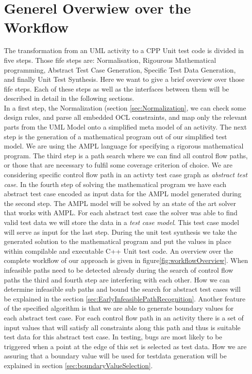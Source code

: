 \section{Generel Overwiew over the Workflow} %
\label{sec:testgenerationOverview}
The transformation from an UML activity to a CPP Unit test code is divided in five steps. Those fife steps are: Normalisation, Rigourous Mathematical programming, Abstract Test Case Generation, Specific Test Data Generation, and finally Unit Test Synthesis. Here we want to give a brief overview over those fife steps. Each of these steps as well as the interfaces between them will be described in detail in the following sections.\\
In a first step, the Normalization (section \ref{sec:Normalization}, we can check some design rules, and parse all embedded OCL constraints, and map only the relevant parts from the UML Model onto a simplified meta model of an activity. The next step is the generation of a mathematical program out of our simplified test model. We are using the AMPL language for specifying a rigorous mathematical program. The third step is a path search where we can find all control flow paths, or those that are necessary to fulfil some coverage criterion of choice. We are considering specific control flow path in an activty test case graph as \emph{abstract test case}. In the fourth step of solving the mathematical program we have each abstract test case encoded as input data for the AMPL model generated during the second step. The AMPL model will be solved by an state of the art solver that works with AMPL. For each abstract test case the solver was able to find valid test data we will store the data in a \emph{test case model}. This test case model will serve as input for the last step. During the unit test synthesis we take the generated solution to the mathematical program and put the values in place within compilable and executable C++ Unit test code. An overview over the complete workflow of our approach is given in figure\ref{fig:workflowOverview}. When infeasible paths need to be detected already during the search of control flow paths the third and fourth step are interfering with each other. How we can determine infeasible sub paths and bound the search for abstract test cases will be explained in the section \ref{sec:EarlyInfeasiblePathRecognition}. Another  feature of the specified algorithm is that we are able to generate boundary values for each abstract test case. For each control flow path in an activity there is a set of input values that will satisfy all constraints along this path and thus is suitable test data for this abstract test case. In testing, bugs are most likely to be triggered when a point at the edge of this set is selected as test data. How we are assuring that a boundary value will be used for testdata generation will be explained in section \ref{sec:boundaryValueSelection}.
